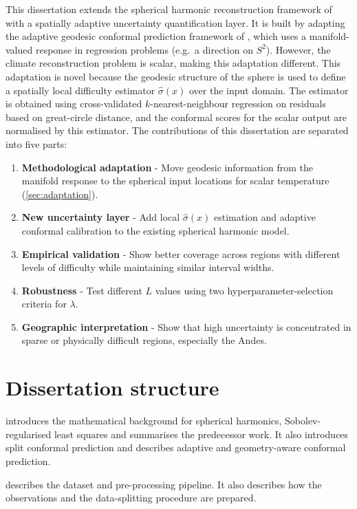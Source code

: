 This dissertation extends the spherical harmonic reconstruction framework of \citet{thomas2025} with a spatially adaptive uncertainty quantification layer. It is built by adapting the adaptive geodesic conformal prediction framework of \citet{amirishahbazi2026}, which uses a manifold-valued response in regression problems (e.g.\ a direction on $S^2$). However, the climate reconstruction problem is scalar, making this adaptation different. This adaptation is novel because the geodesic structure of the sphere is used to define a spatially local difficulty estimator $\hat\sigma(x)$ over the input domain. The estimator is obtained using cross-validated $k$-nearest-neighbour regression on residuals based on great-circle distance, and the conformal scores for the scalar output are normalised by this estimator. The contributions of this dissertation are separated into five parts:

\begin{enumerate}
    \item \textbf{Methodological adaptation} - Move geodesic information from the manifold response to the spherical input locations for scalar temperature (\cref{sec:adaptation}).
    \item \textbf{New uncertainty layer} - Add local $\hat{\sigma}(x)$ estimation and adaptive conformal calibration to the existing spherical harmonic model.
    \item \textbf{Empirical validation} - Show better coverage across regions with different levels of difficulty while maintaining similar interval widths.
    \item \textbf{Robustness} - Test different $L$ values using two hyperparameter-selection criteria for $\lambda$.
    \item \textbf{Geographic interpretation} - Show that high uncertainty is concentrated in sparse or physically difficult regions, especially the Andes.
\end{enumerate}

\section{Dissertation structure}

 introduces the mathematical background for spherical harmonics, Sobolev-regularised least squares and summarises the predecessor work. It also introduces split conformal prediction and describes adaptive and geometry-aware conformal prediction. 

 describes the dataset and pre-processing pipeline. It also describes how the observations and the data-splitting procedure are prepared.

